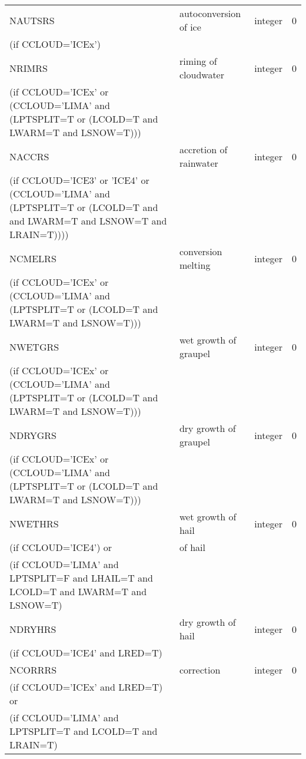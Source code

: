 \begin{longtable} {|p{}|p{}|>{\centering}p{}|p{}<{\centering}|}
NAUTSRS  & autoconversion of ice   & integer  &  0 \index{NAUTSRS!\innam{NAM\_BU\_RRS}}\\ \nopagebreak
(if CCLOUD='ICEx') & &   &  \\\hline
NRIMRS   & riming of cloudwater    & integer  &  0 \index{NRIMRS!\innam{NAM\_BU\_RRS}}\\ \nopagebreak
(if CCLOUD='ICEx' or (CCLOUD='LIMA' and (LPTSPLIT=T or (LCOLD=T and LWARM=T and LSNOW=T))) & & & \\\hline
NACCRS   & accretion of rainwater  & integer  &  0 \index{NACCRS!\innam{NAM\_BU\_RRS}}\\ \nopagebreak
(if CCLOUD='ICE3' or 'ICE4' or (CCLOUD='LIMA' and (LPTSPLIT=T or (LCOLD=T and and LWARM=T and LSNOW=T and LRAIN=T)))) & &   &  \\\hline
NCMELRS  & conversion melting     & integer  &  0 \index{NCMELRS!\innam{NAM\_BU\_RRS}}\\ \nopagebreak
(if CCLOUD='ICEx' or (CCLOUD='LIMA' and (LPTSPLIT=T or (LCOLD=T and LWARM=T and LSNOW=T))) & & & \\\hline
NWETGRS  & wet growth of graupel   & integer  &  0 \index{NWETGRS!\innam{NAM\_BU\_RRS}}\\ \nopagebreak
(if CCLOUD='ICEx' or (CCLOUD='LIMA' and (LPTSPLIT=T or (LCOLD=T and LWARM=T and LSNOW=T))) & & & \\\hline
NDRYGRS  & dry growth of graupel   & integer  &  0 \index{NDRYGRS!\innam{NAM\_BU\_RRS}}\\ \nopagebreak
(if CCLOUD='ICEx' or (CCLOUD='LIMA' and (LPTSPLIT=T or (LCOLD=T and LWARM=T and LSNOW=T))) & & & \\\hline
NWETHRS  & wet growth of hail  & integer  &  0 \index{NWETHRS!\innam{NAM\_BU\_RRS}}\\ \nopagebreak
(if CCLOUD='ICE4') or &of hail &   &  \\
(if CCLOUD='LIMA' and LPTSPLIT=F and LHAIL=T and LCOLD=T and LWARM=T and LSNOW=T) & &   &  \\\hline
NDRYHRS&    dry growth of hail& integer  &  0 \index{NDRYHRS!\innam{NAM\_BU\_RRS}}\\ \nopagebreak
(if CCLOUD='ICE4' and LRED=T) & &   &  \\\hline
NCORRRS&   correction & integer  &  0 \index{NCORRRS!\innam{NAM\_BU\_RRS}}\\ \nopagebreak
(if CCLOUD='ICEx' and LRED=T) or & &   &  \\ \nopagebreak
(if CCLOUD='LIMA' and LPTSPLIT=T and LCOLD=T and LRAIN=T) & &   &  \\\hline

\end{longtable}
